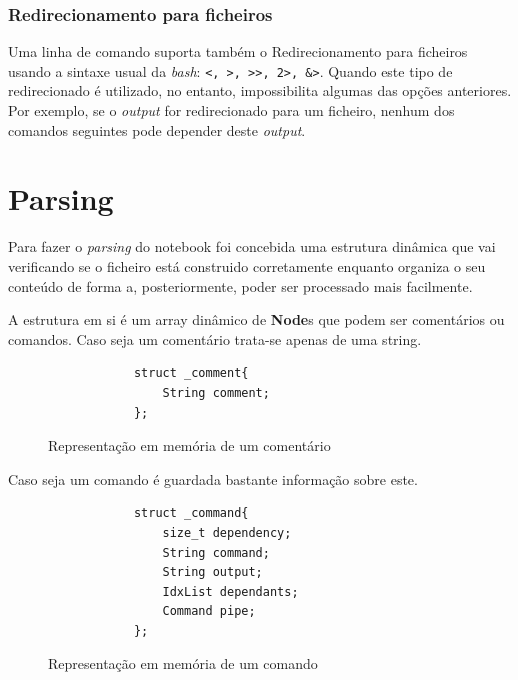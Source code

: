 \documentclass[12pt,a4paper]{report}
\begin{document}
        \subsection{Redirecionamento para ficheiros}
            Uma linha de comando suporta também o Redirecionamento para
            ficheiros usando a sintaxe usual da \textit{bash}:
            \texttt{<, >, >>, 2>, &>}.
            Quando este tipo de redirecionado é utilizado, no entanto,
            impossibilita algumas das opções anteriores. Por exemplo,
            se o \textit{output} for redirecionado para um ficheiro, nenhum dos
            comandos seguintes pode depender deste \textit{output}.

\chapter{Parsing}
    Para fazer o \textit{parsing} do notebook foi concebida uma estrutura
    dinâmica que vai verificando se o ficheiro está construido corretamente
    enquanto organiza o seu conteúdo de forma a, posteriormente, poder ser
    processado mais facilmente.

    A estrutura em si é um array dinâmico de \textbf{Node}s que podem ser
    comentários ou comandos. Caso seja um comentário trata-se apenas de
    uma string.
    \begin{figure}[h]
        \centering
        \begin{verbatim}
            struct _comment{
                String comment;
            };
        \end{verbatim}
        \caption{Representação em memória de um comentário}
        \label{fig:commentStruct}
    \end{figure}

    Caso seja um comando é guardada bastante informação sobre este.
    \begin{figure}[h]
        \centering
        \begin{verbatim}
            struct _command{
                size_t dependency;
                String command;
                String output;
                IdxList dependants;
                Command pipe;
            };
        \end{verbatim}
        \caption{Representação em memória de um comando}
    \end{figure}
\end{document}
